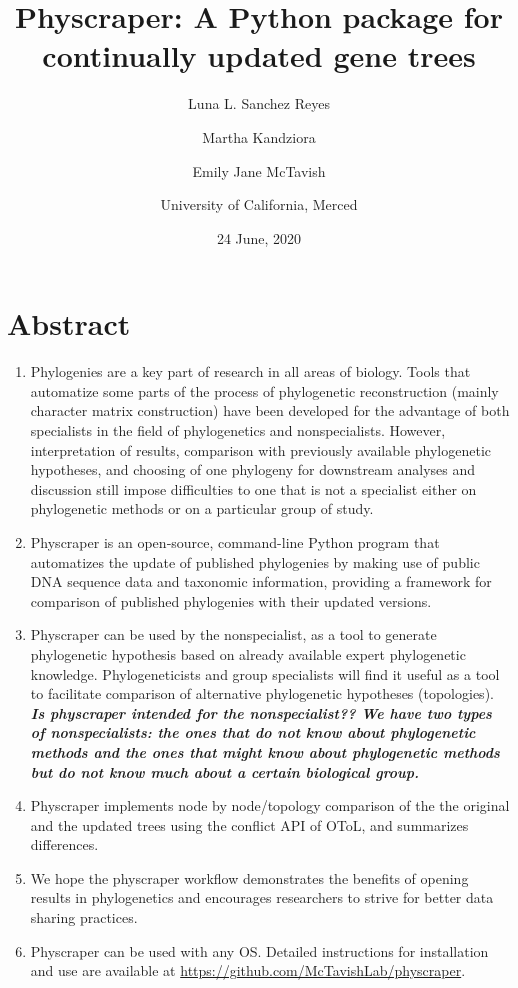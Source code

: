 \documentclass[]{article}
\title{Physcraper: A Python package for continually updated gene trees}
\author{Luna L. Sanchez Reyes \and Martha Kandziora \and Emily Jane McTavish \and University of California, Merced}
\date{24 June, 2020}
\begin{document}
\maketitle

{
\setcounter{tocdepth}{2}
\tableofcontents
}
\hypertarget{abstract}{%
\section{Abstract}\label{abstract}}

\begin{enumerate}
\def\labelenumi{\arabic{enumi}.}
\item
  Phylogenies are a key part of research in all areas of biology. Tools that automatize
  some parts of the process of phylogenetic reconstruction (mainly character matrix construction)
  have been developed for the advantage of both specialists in the field of phylogenetics and nonspecialists.
  However, interpretation of results, comparison with previously available phylogenetic
  hypotheses, and choosing of one phylogeny for downstream analyses and discussion still impose difficulties
  to one that is not a specialist either on phylogenetic methods or on a particular group of study.
\item
  Physcraper is an open‐source, command-line Python program that automatizes the update of published
  phylogenies by making use of public DNA sequence data and taxonomic information,
  providing a framework for comparison of published phylogenies with their updated versions.
\item
  Physcraper can be used by the nonspecialist, as a tool to generate phylogenetic
  hypothesis based on already available expert phylogenetic knowledge.
  Phylogeneticists and group specialists will find it useful as a tool to facilitate comparison
  of alternative phylogenetic hypotheses (topologies).
  \textbf{\emph{Is physcraper intended for the nonspecialist?? We have two types of nonspecialists:
  the ones that do not know about phylogenetic methods and the ones that might know
  about phylogenetic methods but do not know much about a certain biological group.}}
\item
  Physcraper implements node by node/topology comparison of the the original and the updated
  trees using the conflict API of OToL, and summarizes differences.
\item
  We hope the physcraper workflow demonstrates the benefits of opening results in phylogenetics and encourages researchers to strive for better data sharing practices.
\item
  Physcraper can be used with any OS. Detailed instructions for installation and
  use are available at \url{https://github.com/McTavishLab/physcraper}.
\end{enumerate}
\end{document}
